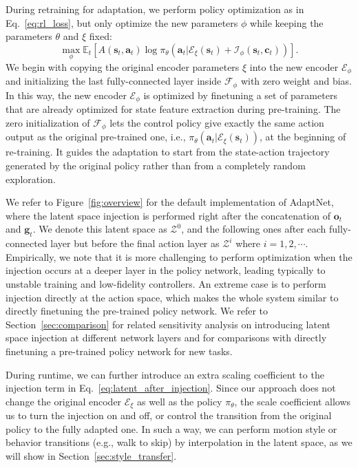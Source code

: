 During retraining for adaptation, we perform policy optimization as in %
Eq.~\ref{eq:rl_loss}, but only optimize the new parameters $\phi$ while keeping the parameters $\theta$ and $\xi$ fixed:    
\begin{equation}\label{eq:injection_loss}
    \max_\phi \mathbb{E}_t \left[A(\mathbf{s}_t, \mathbf{a}_t) \log\pi_\theta(\mathbf{a}_t \vert \mathcal{E}_\xi(\mathbf{s}_t) + \mathcal{I}_\phi(\mathbf{s}_t, \mathbf{c}_t))\right].
\end{equation}
We begin with copying the original encoder parameters $\xi$ into the new encoder $\mathcal{E}_\phi$ and initializing the last fully-connected layer inside $\mathcal{F}_\phi$ with zero weight and bias.
In this way,
the new encoder $\mathcal{E}_\phi$ is optimized by finetuning a set of parameters that are already optimized for state feature extraction during pre-training.
The zero initialization of $\mathcal{F}_\phi$ lets the control policy give exactly the same action output as the original pre-trained one, i.e., $\pi_\theta(\mathbf{a}_t \vert \mathcal{E}_\xi(\mathbf{s}_t))$, at the beginning of re-training.
It guides the adaptation to start from the state-action trajectory generated by the original policy rather than from a completely random exploration.



We refer to Figure~\ref{fig:overview} for 
the default implementation of AdaptNet, where the latent space injection is performed right after the concatenation of $\mathbf{o}_t$ and $\mathbf{g}_t$.
We denote this latent space as $\mathcal{Z}^0$, and the following ones after each fully-connected layer but before the final action layer %
as $\mathcal{Z}^i$  where $i=1,2,\cdots$.
Empirically, we note that it is
more challenging to perform optimization 
when the injection occurs 
at a deeper layer in the policy network, leading typically to unstable training and low-fidelity controllers.  
An extreme case is to perform injection directly at the action space, which makes the whole system similar to directly finetuning the pre-trained policy network.
We refer to Section~\ref{sec:comparison} for related sensitivity analysis on introducing latent space injection at different %
network layers 
and 
for comparisons with directly finetuning a pre-trained policy network for new tasks.

During runtime, we can further introduce an extra scaling coefficient to the injection term in Eq.~\ref{eq:latent_after_injection}.
Since our approach does not change the original encoder $\mathcal{E}_\xi$ as well as the policy $\pi_\theta$, 
the scale coefficient allows us to turn the injection on and off, or
control the transition from the original policy to the fully adapted one. %
In such a way, we can perform %
motion style or behavior transitions (e.g., walk to skip) by interpolation in the latent space,
as we will show in Section~\ref{sec:style_transfer}.

